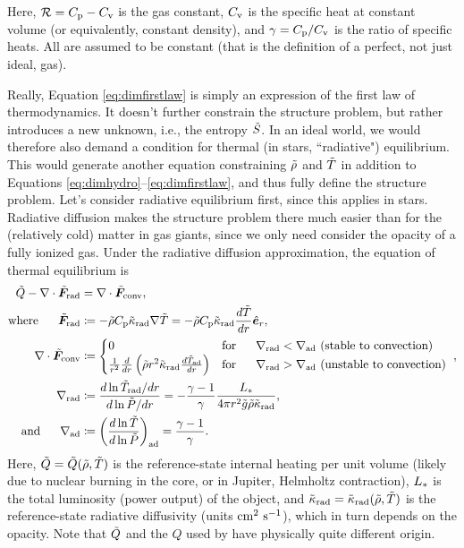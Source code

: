 \documentclass[12pt]{article}
\numberwithin{equation}{section}
\begin{document}
Here, $\mathcal{R}=C_{\rm{p}}-C_{\rm{v}}$ is the gas constant, $C_{\rm{v}}$ is the specific heat at constant volume (or equivalently, constant density), and $\gamma=C_{\rm{p}}/C_{\rm{v}}$ is the ratio of specific heats. All are assumed to be constant (that is the definition of a perfect, not just ideal, gas). 

Really, Equation \eqref{eq:dimfirstlaw} is simply an expression of the first law of thermodynamics. It doesn't further constrain the structure problem, but rather introduces a new unknown, i.e., the entropy $\tilde{S}$. In an ideal world, we would therefore also demand a condition for thermal (in stars, ``radiative") equilibrium. This would generate another equation constraining $\tilde{\rho}$ and $\tilde{T}$ in addition to Equations \eqref{eq:dimhydro}--\eqref{eq:dimfirstlaw}, and thus fully define the structure problem. Let's consider radiative equilibrium first, since this applies in stars. Radiative diffusion makes the structure problem there much easier than for the (relatively cold) matter in gas giants, since we only need consider the opacity of a fully ionized gas. Under the radiative diffusion approximation, the equation of thermal equilibrium is
\begin{subequations}\label{eq:dimradequil}
\begin{align}
	\tilde{Q} - \nabla\cdot\tilde{\bm{F}}_{\rm rad} &= \nabla\cdot\tilde{\bm{F}}_{\rm conv}\label{eq:dimradequil1},\\
	\text{where}\ \ \ \ \  \tilde{\bm{F}}_{\rm rad} &\coloneqq  -\tilde{\rho} C_{\rm{p}}\tilde{\kappa}_{\rm rad} \nabla\tilde{T}=-\tilde{\rho} C_{\rm{p}}\tilde{\kappa}_{\rm rad} \frac{d\tilde{T}}{dr}\hat{\bm{e}}_r,\label{eq:dimradequil2}\\
	 \nabla\cdot\tilde{\bm{F}}_{\rm conv} &\coloneqq \begin{cases} 0 \ \ \ \ \  &\text{for}\ \ \ \ \  \nabla_{\rm rad} <\nabla_{\rm ad}\ \text{(stable to convection)}\\
		\frac{1}{r^2}\frac{d}{dr}\left(\tilde{\rho} r^2\tilde{\kappa}_{\rm rad}\frac{d\tilde{T}_{\rm ad}}{dr}\right) &\text{for}\ \ \ \ \  \nabla_{\rm rad} >\nabla_{\rm ad}\ \text{(unstable to convection)}\
		\end{cases},\label{eq:dimradequil3}\\
		\nabla_{\rm rad}&\coloneqq \frac{d\ln\tilde{T}_{\rm rad}/dr}{d\ln\tilde{P}/dr} = -\frac{\gamma-1}{\gamma}\frac{L_*}{4\pi r^2 \tilde{g} \tilde{\rho} \tilde{\kappa}_{\rm rad}},\label{eq:dimradequil4}\\
		\text{and}\ \ \ \ \  \nabla_{\rm ad}&\coloneqq  \left(\frac{d\ln\tilde{T}}{d\ln\tilde{P}}\right)_{\rm ad} = \frac{\gamma-1}{\gamma}.
\end{align}
\end{subequations}
Here, $\tilde{Q}=\tilde{Q}(\tilde{\rho},\tilde{T})$ is the reference-state internal heating per unit volume (likely due to nuclear burning in the core, or in Jupiter, Helmholtz contraction), $L_*$ is the total luminosity (power output) of the object, and $\tilde{\kappa}_{\rm rad}=\tilde{\kappa}_{\rm rad}(\tilde{\rho},\tilde{T})$ is the reference-state radiative diffusivity (units $\rm{cm^2\ s^{-1}}$), which in turn depends on the opacity. Note that $\tilde{Q}$ and the $Q$ used by {\rayleigh} have physically quite different origin. 
\end{document}
